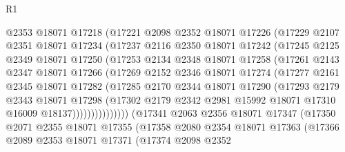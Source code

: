 \begin{lexlean}{R1}
\begin{coremodule}
                @2353
                @18071
                @17218
                (@17221
                  @2098
                  @2352
                  @18071
                  @17226
                  (@17229
                    @2107
                    @2351
                    @18071
                    @17234
                    (@17237
                      @2116
                      @2350
                      @18071
                      @17242
                      (@17245
                        @2125
                        @2349
                        @18071
                        @17250
                        (@17253
                          @2134
                          @2348
                          @18071
                          @17258
                          (@17261
                            @2143
                            @2347
                            @18071
                            @17266
                            (@17269
                              @2152
                              @2346
                              @18071
                              @17274
                              (@17277
                                @2161
                                @2345
                                @18071
                                @17282
                                (@17285
                                  @2170
                                  @2344
                                  @18071
                                  @17290
                                  (@17293
                                    @2179
                                    @2343
                                    @18071
                                    @17298
                                    (@17302
                                      @2179
                                      @2342
                                      @2981
                                      @15992
                                      @18071
                                      @17310
                                      @16009
                                      @18137)))))))))))))))
        (@17341
          @2063
          @2356
          @18071
          @17347
          (@17350
            @2071
            @2355
            @18071
            @17355
            (@17358
              @2080
              @2354
              @18071
              @17363
              (@17366
                @2089
                @2353
                @18071
                @17371
                (@17374
                  @2098
                  @2352

\end{coremodule}
\end{lexlean}

